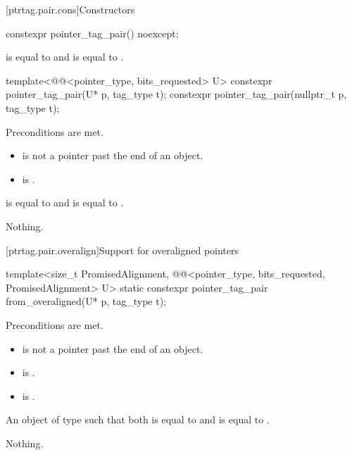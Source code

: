 [ptrtag.pair.cons]{Constructors}

%
\begin{itemdecl}
constexpr pointer_tag_pair() noexcept;
\end{itemdecl}

\begin{itemdescr}
\pnum
\ensures
{} is equal to  and
 is equal to .
\end{itemdescr}

%
\begin{itemdecl}
template<@@<pointer_type, bits_requested> U>
  constexpr pointer_tag_pair(U* p, tag_type t);
constexpr pointer_tag_pair(nullptr_t p, tag_type t);
\end{itemdecl}

\begin{itemdescr}
\pnum
\constantwhen
Preconditions are met.

\pnum
\expects
\begin{itemize}
\item {} is not a pointer past the end of an object.
\item {} is .
\end{itemize}

\pnum
\ensures
{} is equal to  and
 is equal to .

\pnum
\throws
Nothing.
\end{itemdescr}

[ptrtag.pair.overalign]{Support for overaligned pointers}

%
\begin{itemdecl}
template<size_t PromisedAlignment,
         @@<pointer_type, bits_requested, PromisedAlignment> U>
  static constexpr pointer_tag_pair from_overaligned(U* p, tag_type t);
\end{itemdecl}

\begin{itemdescr}
\pnum
\constantwhen
Preconditions are met.

\pnum
\expects
\begin{itemize}
\item {} is not a pointer past the end of an object.
\item {} is .
\item {} is .
\end{itemize}

\pnum
\returns
An object  of type  such that both
 is equal to  and
 is equal to .

\pnum
\throws
Nothing.
\end{itemdescr}


